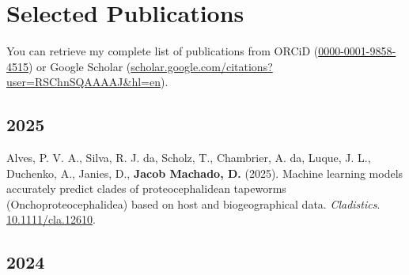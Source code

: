 \documentclass[11pt, letterpaper, sans]{moderncv}
\begin{document}

\section{Selected Publications}

You can retrieve my complete list of publications from ORCiD (\href{https://orcid.org/0000-0001-9858-4515}{0000-0001-9858-4515}) or Google Scholar (\href{https://scholar.google.com/citations?user=RSChnSQAAAAJ\&hl=en}{scholar.google.com/citations?user=RSChnSQAAAAJ\&hl=en}).



\subsection{2025}

	{\setlength{\parskip}{.5em}\renewcommand{\baselinestretch}{2.0}\begin{hangparas}{.25in}{1}

		Alves, P. V. A., Silva, R. J. da, Scholz, T., Chambrier, A. da, Luque, J. L., Duchenko, A., Janies, D., \textbf{Jacob Machado, D.} (2025). Machine learning models accurately predict clades of proteocephalidean tapeworms (Onchoproteocephalidea) based on host and biogeographical data. \textit{Cladistics}. \href{https://doi.org/10.1111/cla.12610}{10.1111/cla.12610}.

	\end{hangparas}}


\subsection{2024}
\end{document}
